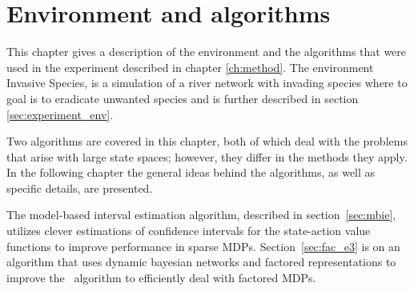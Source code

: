\chapter{Environment and algorithms}
\label{ch:algo}

This chapter gives a description of the environment and the algorithms that
were used in the experiment described in chapter \ref{ch:method}. The environment Invasive Species, is a simulation of a river network with invading species where to goal is to eradicate unwanted species and is further described in section \ref{sec:experiment_env}. 

Two algorithms are covered in this chapter, both of which deal with the
problems that arise with large state spaces; however, they differ in the
methods they apply. In the following chapter the general ideas behind the
algorithms, as well as specific details, are presented. 

The model-based interval estimation algorithm, described in
section~\ref{sec:mbie}, utilizes clever estimations of confidence intervals for
the state-action value functions to improve performance in sparse MDPs.
Section~\ref{sec:fac_e3} is on an algorithm that uses dynamic bayesian networks
and factored representations to improve the \etre\ algorithm to efficiently
deal with factored MDPs. 




